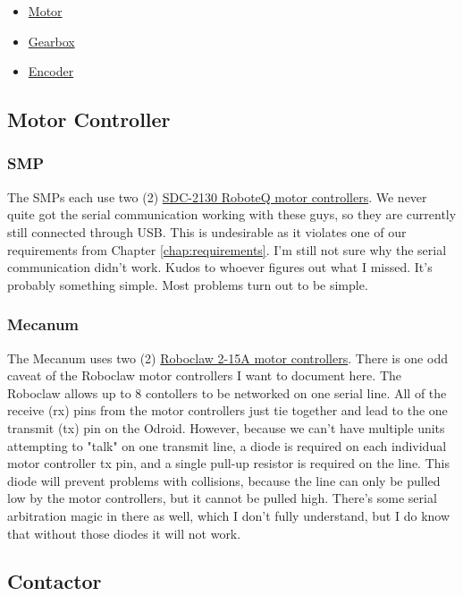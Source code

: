 \begin{itemize}
\item{\href{run:IG42-Gear-Motor.pdf}{Motor}}
\item{\href{run:IG42-Gear-Box.pdf}{Gearbox}}
\item{\href{run:encoder-datasheet.pdf}{Encoder}}
\end{itemize}

\subsection{Motor Controller}

\subsubsection{SMP}

The SMPs each use two (2) \href{run:roboteq-motor-controller.pdf}{SDC-2130 RoboteQ motor controllers}. We never quite got the serial communication working with these guys, so they are currently still connected through USB. This is undesirable as it violates one of our requirements from Chapter \ref{chap:requirements}. I'm still not sure why the serial communication didn't work. Kudos to whoever figures out what I missed. It's probably something simple. Most problems turn out to be simple.

\subsubsection{Mecanum}

The Mecanum uses two (2) \href{run:roboclaw-motor-controller.pdf}{Roboclaw 2-15A motor controllers}. There is one odd caveat of the Roboclaw motor controllers I want to document here. The Roboclaw allows up to 8 contollers to be networked on one serial line. All of the receive (rx) pins from the motor controllers just tie together and lead to the one transmit (tx) pin on the Odroid. However, because we can't have multiple units attempting to "talk" on one transmit line, a diode is required on each individual motor controller tx pin, and a single pull-up resistor is required on the line. This diode will prevent problems with collisions, because the line can only be pulled low by the motor controllers, but it cannot be pulled high. There's some serial arbitration magic in there as well, which I don't fully understand, but I do know that without those diodes it will not work.

\subsection{Contactor}

